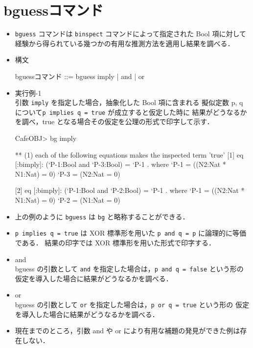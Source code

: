 \documentclass[a4paper,oneside,10pt,here]{memoir}
\newenvironment{vvtm}%
{\parskip=0pt\lineskip=0pt\begin{center}\begin{minipage}{0.8\textwidth}\begin{snugshade}}%
  {\end{snugshade}\end{minipage}\end{center}}
\begin{document}
\section{bguessコマンド}
\begin{itemize}
\item \verb|bguess| コマンドは \verb|binspect| コマンドによって指定された Bool 項に対して
  経験から得られている幾つかの有用な推測方法を適用し結果を調べる．
\item 構文
\begin{vvtm}
\begin{simplev}
 bguessコマンド ::= bguess { imply | and | or }
\end{simplev}
\end{vvtm}
\item 実行例-1 \\
  引数 \verb|imply| を指定した場合，抽象化した Bool 項に含まれる
  擬似定数 p, q について\verb|p implies q = true| が成立すると仮定した時に
  結果がどうなるかを調べ，true となる場合その仮定を公理の形式で印字して示す．
\begin{simplev}
CafeOBJ> bg imply

** (1) each of the following equations makes the inspected term 'true'
[1] eq [:bimply]: (`P-1:Bool and `P-3:Bool) = `P-1 .
where
  `P-1 = ((N2:Nat * N1:Nat) = 0)
  `P-3 = (N2:Nat = 0)

[2] eq [:bimply]: (`P-1:Bool and `P-2:Bool) = `P-1 .
where
  `P-1 = ((N2:Nat * N1:Nat) = 0)
  `P-2 = (N1:Nat = 0)
\end{simplev}
\item 上の例のように \verb|bguess| は \verb|bg| と略称することができる．
\item \verb|p implies q = true| は XOR 標準形を用いた \verb|p and q = p| に論理的に等価である．
  結果の印字では XOR 標準形を用いた形式で印字する．
\item and \\
  bguess の引数として \verb|and| を指定した場合は，\verb|p and q = false| という形の
  仮定を導入した場合に結果がどうなるかを調べる．
\item or \\
  bguess の引数として \verb|or| を指定した場合は，\verb|p or q = true| という形の
  仮定を導入した場合に結果がどうなるかを調べる．
\item 現在までのところ，引数 and や or により有用な補題の発見ができた例は存在しない．
\end{itemize}
\end{document}
